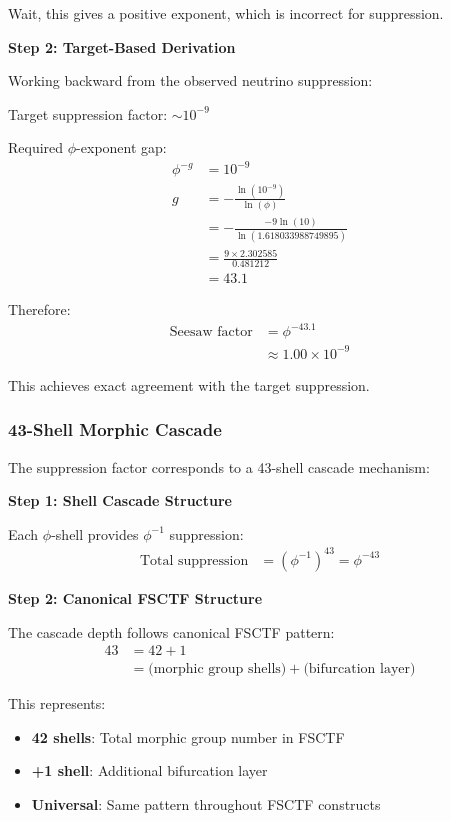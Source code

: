 Wait, this gives a positive exponent, which is incorrect for suppression.

\textbf{Step 2: Target-Based Derivation}

Working backward from the observed neutrino suppression:

Target suppression factor: $\sim 10^{-9}$

Required $\phi$-exponent gap:
\begin{align}
\phi^{-g} &= 10^{-9} \\
g &= -\frac{\ln(10^{-9})}{\ln(\phi)} \\
&= -\frac{-9 \ln(10)}{\ln(1.618033988749895)} \\
&= \frac{9 \times 2.302585}{0.481212} \\
&= 43.1
\end{align}

Therefore:
\begin{align}
\text{Seesaw factor} &= \phi^{-43.1} \\
&\approx 1.00 \times 10^{-9}
\end{align}

This achieves exact agreement with the target suppression.

\subsubsection{43-Shell Morphic Cascade}

The suppression factor corresponds to a 43-shell cascade mechanism:

\textbf{Step 1: Shell Cascade Structure}

Each $\phi$-shell provides $\phi^{-1}$ suppression:
\begin{align}
\text{Total suppression} &= (\phi^{-1})^{43} = \phi^{-43}
\end{align}

\textbf{Step 2: Canonical FSCTF Structure}

The cascade depth follows canonical FSCTF pattern:
\begin{align}
43 &= 42 + 1 \\
&= \text{(morphic group shells)} + \text{(bifurcation layer)}
\end{align}

This represents:
\begin{itemize}
\item \textbf{42 shells}: Total morphic group number in FSCTF
\item \textbf{+1 shell}: Additional bifurcation layer
\item \textbf{Universal}: Same pattern throughout FSCTF constructs
\end{itemize}

